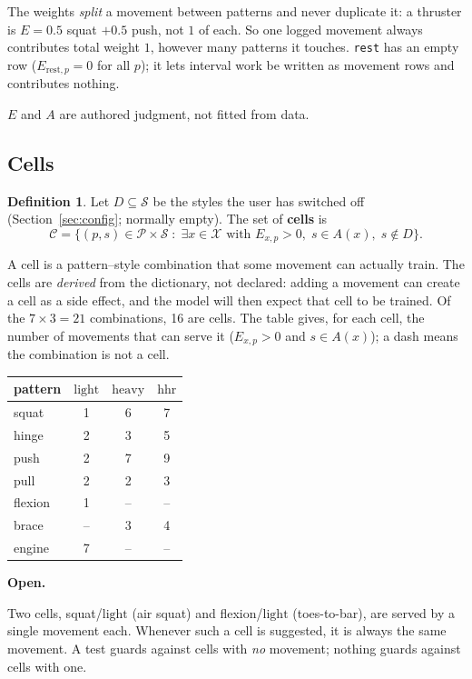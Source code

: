 \documentclass[11pt]{article}
\newenvironment{openitem}{%
  \def\FrameCommand{\fboxsep=8pt{\color{openbar}\vrule width 3pt}\colorbox{openbg}}%
  \MakeFramed{\advance\hsize-\width \FrameRestore}\noindent
  \textbf{Open.}\ %
}{%
  \endMakeFramed\medskip
}
\theoremstyle{plain}
\theoremstyle{definition}
\newtheorem{definition}{Definition}
\newcommand{\code}[1]{\texttt{#1}}
\newcommand{\Pat}{\mathcal{P}}
\newcommand{\Sty}{\mathcal{S}}
\newcommand{\Mov}{\mathcal{X}}
\newcommand{\Cell}{\mathcal{C}}
\newcommand{\light}{\mathrm{light}}
\newcommand{\heavy}{\mathrm{heavy}}
\newcommand{\hhr}{\mathrm{hhr}}
\begin{document}
The weights \emph{split} a movement between patterns and never duplicate
it: a thruster is $E = 0.5$ squat $+ 0.5$ push, not $1$ of each. So one
logged movement always contributes total weight $1$, however many
patterns it touches. \code{rest} has an empty row ($E_{\mathrm{rest},p} =
0$ for all $p$); it lets interval work be written as movement rows and
contributes nothing.

$E$ and $A$ are authored judgment, not fitted from data.

\subsection{Cells}

\begin{definition}
Let $D \subseteq \Sty$ be the styles the user has switched off
(Section~\ref{sec:config}; normally empty). The set of \textbf{cells} is
\[
\Cell = \bigl\{ (p, s) \in \Pat \times \Sty \;:\;
\exists x \in \Mov \text{ with } E_{x,p} > 0,\; s \in A(x),\; s \notin D
\bigr\}.
\]
\end{definition}

A cell is a pattern--style combination that some movement can actually
train. The cells are \emph{derived} from the dictionary, not declared:
adding a movement can create a cell as a side effect, and the model will
then expect that cell to be trained. Of the $7 \times 3 = 21$
combinations, 16 are cells. The table gives, for each cell, the number of
movements that can serve it ($E_{x,p} > 0$ and $s \in A(x)$); a dash
means the combination is not a cell.

\begin{center}
\begin{tabular}{lccc}
\toprule
pattern & $\light$ & $\heavy$ & $\hhr$ \\
\midrule
squat   & 1 & 6 & 7 \\
hinge   & 2 & 3 & 5 \\
push    & 2 & 7 & 9 \\
pull    & 2 & 2 & 3 \\
flexion & 1 & -- & -- \\
brace   & -- & 3 & 4 \\
engine  & 7 & -- & -- \\
\bottomrule
\end{tabular}
\end{center}

\begin{openitem}
Two cells, squat/$\light$ (air squat) and flexion/$\light$
(toes-to-bar), are served by a single movement each. Whenever such a cell
is suggested, it is always the same movement. A test guards against
cells with \emph{no} movement; nothing guards against cells with one.
\end{openitem}
\end{document}
